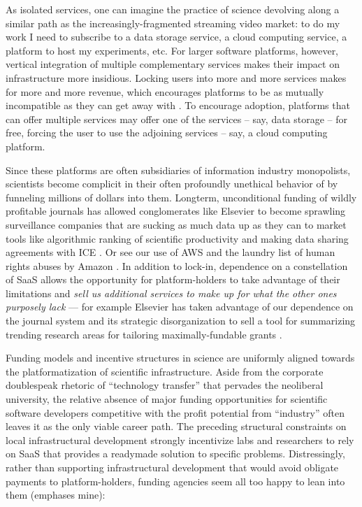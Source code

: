 \documentclass[10pt]{tufte-book}
\begin{document}
As isolated services, one can imagine the practice of science devolving
along a similar path as the increasingly-fragmented streaming video
market: to do my work I need to subscribe to a data storage service, a
cloud computing service, a platform to host my experiments, etc. For
larger software platforms, however, vertical integration of multiple
complementary services makes their impact on infrastructure more
insidious. Locking users into more and more services makes for more and
more revenue, which encourages platforms to be as mutually incompatible
as they can get away with \citep{macinnesCompatibilityStandardsMonopoly2005} . To encourage adoption,
platforms that can offer multiple services may offer one of the services
-- say, data storage -- for free, forcing the user to use the adjoining
services -- say, a cloud computing platform.

Since these platforms are often subsidiaries of information industry
monopolists, scientists become complicit in their often profoundly
unethical behavior of by funneling millions of dollars into them.
Longterm, unconditional funding of wildly profitable journals has
allowed conglomerates like Elsevier to become sprawling surveillance
companies \citep{RELXAnnualReport2020}  that are sucking as much
data up as they can to market tools like algorithmic ranking of
scientific productivity \citep{brembsAlgorithmicEmploymentDecisions2021}  and making data sharing
agreements with ICE \citep{biddleLexisNexisProvideGiant2021} . Or
see our use of AWS and the laundry list of human rights abuses by Amazon
\citep{CriticismAmazon2021} . In addition to lock-in, dependence
on a constellation of SaaS allows the opportunity for platform-holders
to take advantage of their limitations and \emph{sell us additional
services to make up for what the other ones purposely lack} --- for
example Elsevier has taken advantage of our dependence on the journal
system and its strategic disorganization to sell a tool for summarizing
trending research areas for tailoring maximally-fundable grants \citep{elsevierTopicProminenceSciencea} .

Funding models and incentive structures in science are uniformly aligned
towards the platformatization of scientific infrastructure. Aside from
the corporate doublespeak rhetoric of ``technology transfer'' that
pervades the neoliberal university, the relative absence of major
funding opportunities for scientific software developers competitive
with the profit potential from ``industry'' often leaves it as the only
viable career path. The preceding structural constraints on local
infrastructural development strongly incentivize labs and researchers to
rely on SaaS that provides a readymade solution to specific problems.
Distressingly, rather than supporting infrastructural development that
would avoid obligate payments to platform-holders, funding agencies seem
all too happy to lean into them (emphases mine):
\end{document}
